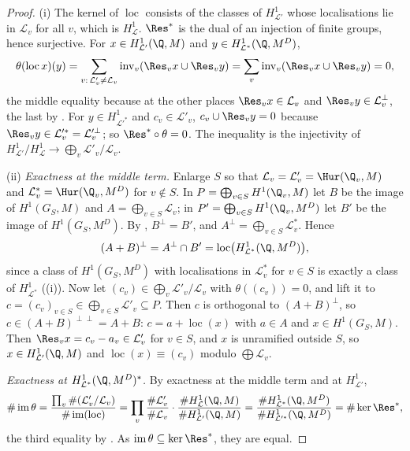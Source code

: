 \begin{proof}
(i) The kernel of $\operatorname{loc}$ consists of the classes of $H^1_{\mathcal L'}$ whose localisations lie in $\mathcal L_v$ for all $v$, which is $H^1_{\mathcal L}$. $\Res^*$ is the dual of an
injection of finite groups, hence surjective. For $x\in H^1_{\mathcal L'}(\Q,M)$ and $y\in H^1_{\mathcal L^*}(\Q,M^D)$,
\[
\theta(\operatorname{loc}x)(y)=\sum_{v:\,\mathcal L'_v\ne\mathcal L_v}\operatorname{inv}_v(\Res_vx\cup\Res_vy)=\sum_v\operatorname{inv}_v(\Res_vx\cup\Res_vy)=0,
\]
the middle equality because at the other places $\Res_vx\in\mathcal L_v$ and $\Res_vy\in\mathcal L_v^\perp$, the last by . For $y\in H^1_{\mathcal L'^*}$ and
$c_v\in\mathcal L'_v$, $c_v\cup\Res_vy=0$ because $\Res_vy\in\mathcal L'^*_v=\mathcal L_v'^\perp$; so $\Res^*\circ\theta=0$. The inequality is the injectivity of
$H^1_{\mathcal L'}/H^1_{\mathcal L}\to\bigoplus_v\mathcal L'_v/\mathcal L_v$.

(ii) \emph{Exactness at the middle term.} Enlarge $S$ so that $\mathcal L_v=\mathcal L'_v=\Hur(\Q_v,M)$ and $\mathcal L^*_v=\Hur(\Q_v,M^D)$ for $v\notin S$. In $P=\bigoplus_{v\in S}H^1(\Q_v,M)$ let $B$ be
the image of $H^1(G_S,M)$ and $A=\bigoplus_{v\in S}\mathcal L_v$; in $P'=\bigoplus_{v\in S}H^1(\Q_v,M^D)$ let $B'$ be the image of $H^1(G_S,M^D)$. By ,
$B^\perp=B'$, and $A^\perp=\bigoplus_{v\in S}\mathcal L^*_v$. Hence
\[
(A+B)^\perp=A^\perp\cap B'=\operatorname{loc}\bigl(H^1_{\mathcal L^*}(\Q,M^D)\bigr),
\]
since a class of $H^1(G_S,M^D)$ with localisations in $\mathcal L^*_v$ for $v\in S$ is exactly a class of $H^1_{\mathcal L^*}$ ((i)). Now let
$(c_v)\in\bigoplus_v\mathcal L'_v/\mathcal L_v$ with $\theta((c_v))=0$, and lift it to $c=(c_v)_{v\in S}\in\bigoplus_{v\in S}\mathcal L'_v\subseteq P$. Then $c$ is orthogonal to
$(A+B)^\perp$, so $c\in(A+B)^{\perp\perp}=A+B$: $c=a+\operatorname{loc}(x)$ with $a\in A$ and $x\in H^1(G_S,M)$. Then $\Res_vx=c_v-a_v\in\mathcal L'_v$ for $v\in S$, and $x$ is
unramified outside $S$, so $x\in H^1_{\mathcal L'}(\Q,M)$ and $\operatorname{loc}(x)\equiv(c_v)$ modulo $\bigoplus\mathcal L_v$.

\emph{Exactness at $H^1_{\mathcal L^*}(\Q,M^D)^*$.} By exactness at the middle term and at $H^1_{\mathcal L'}$,
\[
\#\operatorname{im}\theta=\frac{\prod_v\#(\mathcal L'_v/\mathcal L_v)}{\#\operatorname{im}(\operatorname{loc})}=\prod_v\frac{\#\mathcal L'_v}{\#\mathcal L_v}\cdot\frac{\#H^1_{\mathcal L}(\Q,M)}{\#H^1_{\mathcal L'}(\Q,M)}
=\frac{\#H^1_{\mathcal L^*}(\Q,M^D)}{\#H^1_{\mathcal L'^*}(\Q,M^D)}=\#\ker\Res^*,
\]
the third equality by . As $\operatorname{im}\theta\subseteq\ker\Res^*$, they are equal.
\end{proof}

